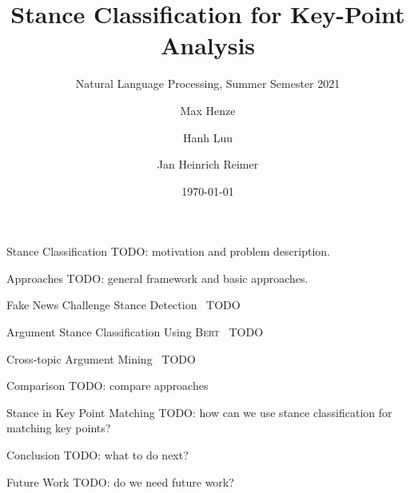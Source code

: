 \documentclass[english,handout]{mlutalk}
\title{Stance Classification for Key-Point Analysis}
\subtitle{Natural Language Processing, Summer Semester 2021}
\author{Max Henze \and Hanh Luu \and Jan Heinrich Reimer}
\institute{Martin Luther University Halle-Wittenberg}
\date{\today}
\newcommand{\Bert}{\textsc{Bert}\xspace}
\begin{document}
\titleframe

\begin{frame}{Stance Classification}
  TODO: motivation and problem description.
\end{frame}

\begin{frame}{Approaches}
  TODO: general framework and basic approaches.
\end{frame}

\begin{frame}{Fake News Challenge Stance Detection~\cite{HanselowskiSSCC2018}}
  TODO
\end{frame}

\begin{frame}{Argument Stance Classification Using \Bert~\cite{OllingerDSBS2020}}
  TODO
\end{frame}

\begin{frame}{Cross-topic Argument Mining~\cite{StabMSRG2018}}
  TODO
\end{frame}

\begin{frame}{Comparison}
  TODO: compare approaches
\end{frame}

\begin{frame}{Stance in Key Point Matching}
  TODO: how can we use stance classification for matching key points?
\end{frame}

\begin{frame}{Conclusion}
  TODO: what to do next?
\end{frame}

\begin{frame}{Future Work}
  TODO: do we need future work?
  \thankyou
\end{frame}

\appendix
\section{\appendixname}

\bibliographyframe
\end{document}
